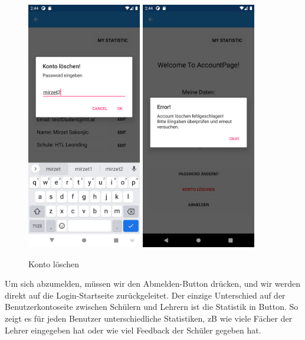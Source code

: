 \begin{figure}[h]
    \begin{center}
        \includegraphics[width=5cm]{pics/Xamarin Student/23 Delete Acc Error.png}\hfill
        \includegraphics[width=5cm]{pics/Xamarin Student/24 Delete Acc Error.png}
        \caption[MyAccount]{Konto löschen}
        \end{center}
\end{figure}
Um sich abzumelden, müssen wir den Abmelden-Button drücken, und wir werden direkt auf die Login-Startseite zurückgeleitet.
Der einzige Unterschied auf der Benutzerkontoseite zwischen Schülern und Lehrern ist die Statistik in Button. So zeigt es für jeden Benutzer unterschiedliche Statistiken, zB wie viele Fächer der Lehrer eingegeben hat oder wie viel Feedback der Schüler gegeben hat.
\newpage

